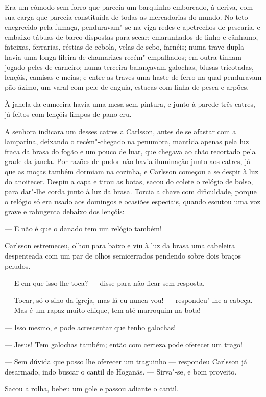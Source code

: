 Era um cômodo sem forro que parecia um barquinho emborcado, à deriva, com sua
carga que parecia constituída de todas as mercadorias do mundo. No teto
enegrecido pela fumaça, penduravam"-se na viga redes e apetrechos de pescaria, e
embaixo tábuas de barco dispostas para secar; emaranhados de linho e cânhamo,
fateixas, ferrarias, réstias de cebola, velas de sebo, farnéis; numa trave dupla
havia uma longa fileira de chamarizes recém"-empalhados; em outra tinham jogado
peles de carneiro; numa terceira balançavam galochas, blusas tricotadas,
lençóis, camisas e meias; e entre as traves uma haste de ferro na qual
penduravam pão ázimo, um varal com pele de enguia, estacas com linha de pesca e
arpões.

À janela da cumeeira havia uma mesa sem pintura, e junto à parede três
catres, já feitos com lençóis limpos de pano cru.

A senhora indicara um desses catres a Carlsson, antes de se afastar com a
lamparina, deixando o recém"-chegado na penumbra, mantida apenas pela luz fraca
da brasa do fogão e um pouco de luar, que chegava ao chão recortado pela grade
da janela. Por razões de pudor não havia iluminação junto aos catres, já que as
moças também dormiam na cozinha, e Carlsson começou a se despir à luz do
anoitecer. Despiu a capa e tirou as botas, sacou do colete o relógio 
de bolso, para dar"-lhe corda junto à luz da brasa. Torcia a chave com dificuldade, 
porque o relógio só era usado aos domingos e ocasiões especiais,
quando escutou uma voz grave e rabugenta debaixo dos lençóis:

--- E não é que o danado tem um relógio também!

Carlsson estremeceu, olhou para baixo e viu à luz da brasa uma cabeleira
despenteada com um par de olhos semicerrados pendendo sobre dois braços peludos.

--- E em que isso lhe toca? --- disse para não ficar sem resposta.

--- Tocar, só o sino da igreja, mas lá eu nunca vou! --- respondeu"-lhe a cabeça.
--- Mas é um rapaz muito chique, tem até marroquim na bota!

--- Isso mesmo, e pode acrescentar que tenho galochas!

--- Jesus! Tem galochas também; então com certeza pode oferecer um trago!

--- Sem dúvida que posso lhe oferecer um traguinho --- respondeu Carlsson já
desarmado, indo buscar o cantil de Höganäs. --- Sirva"-se, e bom proveito.

Sacou a rolha, bebeu um gole e passou adiante o cantil.

